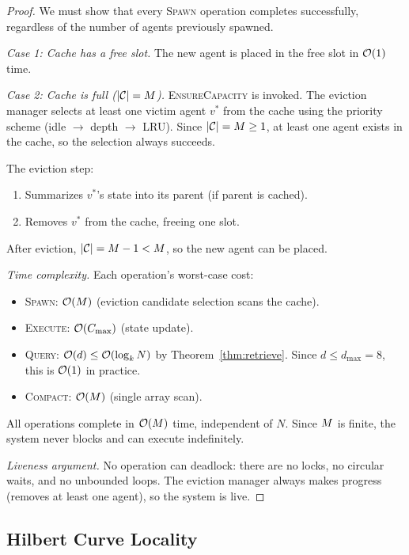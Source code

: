 \begin{proof}
We must show that every \textsc{Spawn} operation completes
successfully, regardless of the number of agents previously spawned.

\emph{Case 1: Cache has a free slot.}
The new agent is placed in the free slot in $\mathcal{O}(1)$ time.

\emph{Case 2: Cache is full ($|\mathcal{C}| = M$).}
\textsc{EnsureCapacity} is invoked.  The eviction manager selects
at least one victim agent $v^*$ from the cache using the priority
scheme (idle $\to$ depth $\to$ LRU).  Since $|\mathcal{C}| = M \geq 1$,
at least one agent exists in the cache, so the selection always
succeeds.

The eviction step:
\begin{enumerate}
  \item Summarizes $v^*$'s state into its parent (if parent is cached).
  \item Removes $v^*$ from the cache, freeing one slot.
\end{enumerate}

After eviction, $|\mathcal{C}| = M - 1 < M$, so the new agent
can be placed.

\emph{Time complexity.}  Each operation's worst-case cost:
\begin{itemize}
  \item \textsc{Spawn}: $\mathcal{O}(M)$ (eviction candidate selection
    scans the cache).
  \item \textsc{Execute}: $\mathcal{O}(C_{\max})$ (state update).
  \item \textsc{Query}: $\mathcal{O}(d) \leq \mathcal{O}(\log_k N)$ by
    Theorem~\ref{thm:retrieve}.  Since $d \leq d_{\max} = 8$,
    this is $\mathcal{O}(1)$ in practice.
  \item \textsc{Compact}: $\mathcal{O}(M)$ (single array scan).
\end{itemize}

All operations complete in $\mathcal{O}(M)$ time, independent of $N$.
Since $M$ is finite, the system never blocks and can execute
indefinitely.

\emph{Liveness argument.}  No operation can deadlock: there are no
locks, no circular waits, and no unbounded loops.  The eviction
manager always makes progress (removes at least one agent), so the
system is live.
\end{proof}


\subsection{Hilbert Curve Locality}
\label{sec:hilbert-analysis}

